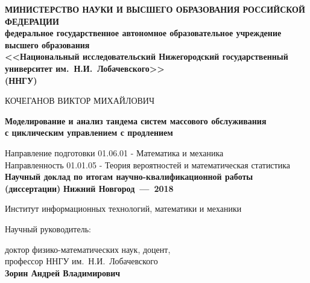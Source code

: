 \documentclass[10pt]{extarticle}
\begin{document}
\begin{titlepage}

  \begin{center}
    \textbf{МИНИСТЕРСТВО НАУКИ И ВЫСШЕГО ОБРАЗОВАНИЯ РОССИЙСКОЙ ФЕДЕРАЦИИ\\
    федеральное государственное автономное образовательное учреждение
    высшего образования\\ {\large <<Национальный исследовательский Нижегородский государственный университет им.~Н.И.~Лобачевского>>  \\(ННГУ)}}
    
    \vfill 
    
    {\Large КОЧЕГАНОВ ВИКТОР МИХАЙЛОВИЧ
    \bigskip
    \bigskip
    \bigskip

     \textbf{Моделирование и анализ тандема систем массового обслуживания\\ с циклическим управлением с продлением}
    }
    
    \bigskip
    \bigskip
    {\large Направление подготовки 	01.06.01 - Математика и механика \\
    Направленность  01.01.05 - Теория вероятностей и математическая статистика\\
    }
    \bigskip
    \bigskip
        \bigskip
    \bigskip
            \bigskip
    \bigskip
    \textbf{\Large Научный доклад по итогам научно-квалификационной работы\\
    (диссертации)}
        \vfill 
    \vfill 
    \vfill 
    \textbf{\large Нижний Новгород~---~2018}
  \end{center}
  
\end{titlepage}

\thispagestyle{empty}

{\large Институт информационных технологий, математики и механики\\
\medskip

Научный руководитель:

\medskip
 доктор физико-математических наук, доцент,\\
\indent профессор ННГУ им.~Н.И.~Лобачевского\\
\indent \textbf{Зорин Андрей Владимирович}
}
\end{document}
